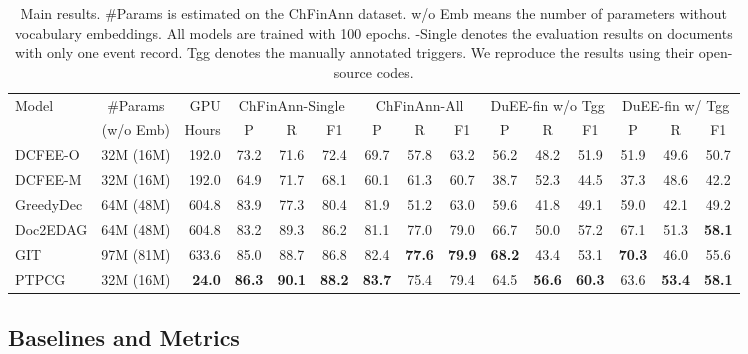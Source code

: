 \begin{table*}[tb]
    \centering
    \small
    \begin{tabular}{lcrcccccccccccc}
        \toprule
        \multirow{2}{*}{Model} & \#Params & GPU & \multicolumn{3}{c}{ChFinAnn-Single} & \multicolumn{3}{c}{ChFinAnn-All} & \multicolumn{3}{c}{DuEE-fin w/o Tgg} & \multicolumn{3}{c}{DuEE-fin w/ Tgg}\\
        \cmidrule(lr){4-6}\cmidrule(lr){7-9}\cmidrule(lr){10-12}\cmidrule(lr){13-15}
        &(w/o Emb) & Hours & P & R & F1 & P & R & F1 & P & R & F1 & P & R & F1 \\
        \midrule
        DCFEE-O & 32M (16M) & 192.0 & 73.2 & 71.6 & 72.4 & 69.7 & 57.8 & 63.2 & 56.2 & 48.2 & 51.9 & 51.9 & 49.6 & 50.7 \\
        DCFEE-M & 32M (16M) & 192.0 & 64.9 & 71.7 & 68.1 & 60.1 & 61.3 & 60.7 & 38.7 & 52.3 & 44.5 & 37.3 & 48.6 & 42.2 \\
        GreedyDec & 64M (48M) & 604.8 & 83.9 & 77.3 & 80.4 & 81.9 & 51.2 & 63.0 & 59.6 & 41.8 & 49.1 & 59.0 & 42.1 & 49.2 \\
        Doc2EDAG & 64M (48M) & 604.8 & 83.2 & 89.3 & 86.2 & 81.1 & 77.0 & 79.0 & 66.7 & 50.0 & 57.2 & 67.1 & 51.3 & \textbf{58.1} \\
        GIT & 97M (81M) & 633.6 & 85.0 & 88.7 & 86.8 & 82.4 & \textbf{77.6} & \textbf{79.9} & \textbf{68.2} & 43.4 & 53.1 & \textbf{70.3} & 46.0 & 55.6 \\
        \midrule
        PTPCG & 32M (16M) & \textbf{24.0} & \textbf{86.3} & \textbf{90.1} & \textbf{88.2} & \textbf{83.7} & 75.4 & 79.4 & 64.5 & \textbf{56.6} & \textbf{60.3} & 63.6 & \textbf{53.4} & \textbf{58.1} \\
        \bottomrule
    \end{tabular}
    \caption{
        Main results.
        \#Params is estimated on the ChFinAnn dataset.
        w/o Emb means the number of parameters without vocabulary embeddings.
        All models are trained with 100 epochs.
        -Single denotes the evaluation results on documents with only one event record.
        Tgg denotes the manually annotated triggers.
        We reproduce the results using their open-source codes.
    }
    \label{tab:exp_results_comparison}
\end{table*}

\subsection{Baselines and Metrics}

